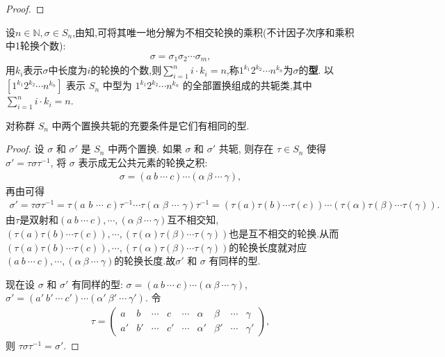 \documentclass[../../main.tex]{subfiles}%
\begin{document}
\begin{proof}
\end{proof}

\begin{definition}[置换的型]
设$n\in \mathbb{N},\sigma \in S_n$,由知,可将其唯一地分解为不相交轮换的乘积(不计因子次序和乘积中1轮换个数):
\begin{align*}
\sigma = \sigma_1\sigma_2\cdots \sigma_m,
\end{align*}
用$k_i$表示$\sigma$中长度为$i$的轮换的个数,则$\sum_{i=1}^{n}i\cdot k_i=n$,称$1^{k_1}2^{k_2}\cdots n^{k_n}$为$\sigma$的\textbf{型}.
以 $[1^{k_1} 2^{k_2} \cdots n^{k_n}]$ 表示 $S_n$ 中型为 $1^{k_1} 2^{k_2} \cdots n^{k_n}$ 的全部置换组成的共轭类,其中$\sum_{i=1}^{n}i\cdot k_i=n$. 
\end{definition}

\begin{theorem}[两个置换共轭的充要条件是它们有相同的型]\label{theorem:对称群中置换共轭等价于型相同}
对称群 $S_n$ 中两个置换共轭的充要条件是它们有相同的型.
\end{theorem}
\begin{proof}

设 $\sigma$ 和 $\sigma'$ 是 $S_n$ 中两个置换. 如果 $\sigma$ 和 $\sigma'$ 共轭, 则存在 $\tau \in S_n$ 使得 $\sigma' = \tau\sigma\tau^{-1}$, 将 $\sigma$ 表示成无公共元素的轮换之积:
\begin{align*}
\sigma = (a\ b\ \cdots\ c)\cdots(\alpha\ \beta\ \cdots\ \gamma),
\end{align*}
再由可得
\begin{align*}
\sigma' =\tau \sigma \tau ^{-1}=\tau (a\,\,b\,\,\cdots \,\,c)\tau ^{-1}\cdots \tau (\alpha \,\,\beta \,\,\cdots \,\,\gamma )\tau ^{-1}=(\tau (a) \tau (b)\cdots \tau (c))\cdots (\tau (\alpha ) \tau (\beta )\cdots \tau (\gamma )).
\end{align*}
由$\tau$是双射和$(a\ b\ \cdots\ c),\cdots,(\alpha\ \beta\ \cdots\ \gamma)$互不相交知,$(\tau (a) \tau (b)\cdots \tau (c)),\cdots, (\tau (\alpha ) \tau (\beta )\cdots \tau (\gamma ))$也是互不相交的轮换.从而$(\tau (a) \tau (b)\cdots \tau (c)),\cdots, (\tau (\alpha ) \tau (\beta )\cdots \tau (\gamma ))$的轮换长度就对应$(a\ b\ \cdots\ c),\cdots,(\alpha\ \beta\ \cdots\ \gamma)$的轮换长度.故$\sigma'$ 和 $\sigma$ 有同样的型. 

现在设 $\sigma$ 和 $\sigma'$ 有同样的型: $\sigma = (a\ b\ \cdots\ c)\cdots(\alpha\ \beta\ \cdots\ \gamma)$, $\sigma' = (a'\ b'\ \cdots\ c')\cdots(\alpha'\ \beta'\ \cdots\ \gamma')$. 令
\begin{align*}
\tau = \begin{pmatrix}
a & b & \cdots & c & \cdots & \alpha & \beta & \cdots & \gamma \\
a' & b' & \cdots & c' & \cdots & \alpha' & \beta' & \cdots & \gamma'
\end{pmatrix},
\end{align*}
则 $\tau\sigma\tau^{-1} = \sigma'$. 

\end{proof}
\end{document}
